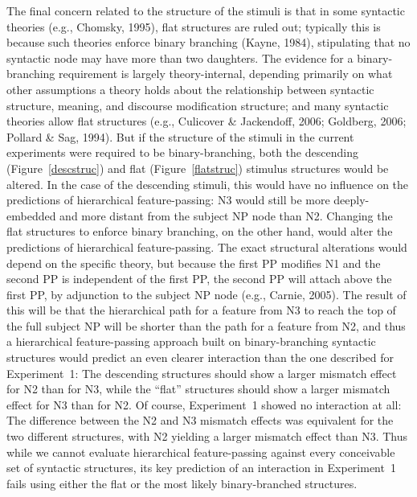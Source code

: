 \documentclass[12pt,titlepage]{article}
\newcommand{\TODO}[1]{\textbf{*** #1 ***}}  %
\newcommand{\IGNORE}[1]{} %
\begin{document}
The final concern related to the structure of the stimuli is that in some
syntactic theories (e.g., Chomsky, 1995\IGNORE{; \TODO{cite 1--2 other
theories/papers}}), flat structures are ruled out; typically this is
because such theories enforce binary branching (Kayne, 1984), stipulating
that no syntactic node may have more than two daughters.  The evidence for
a binary-branching requirement is largely theory-internal\IGNORE{ (though
cf.\ \TODO{Iris' suggested paper} and responses)}, depending primarily on
what other assumptions a theory holds about the relationship between
syntactic structure, meaning, and discourse modification structure; and
many syntactic theories allow flat structures (e.g., Culicover \&
Jackendoff, 2006; Goldberg, 2006; Pollard \& Sag, 1994).  But if the
structure of the stimuli in the current experiments were required to be
binary-branching, both the descending (Figure~\ref{descstruc}) and flat
(Figure~\ref{flatstruc}) stimulus structures would be altered.  In the case
of the descending stimuli, this would have no influence on the predictions
of hierarchical feature-passing: N3 would still be more deeply-embedded and
more distant from the subject NP node than N2.  Changing the flat
structures to enforce binary branching, on the other hand, would alter the
predictions of hierarchical feature-passing.  The exact structural
alterations would depend on the specific theory, but because the first PP
modifies N1 and the second PP is independent of the first PP, the second PP
will attach above the first PP, by adjunction to the subject NP node (e.g.,
Carnie, 2005\IGNORE{pg 121}).  The result of this will be that the
hierarchical path for a feature from N3 to reach the top of the full
subject NP will be shorter than the path for a feature from N2, and thus a
hierarchical feature-passing approach built on binary-branching syntactic
structures would predict an even clearer interaction than the one described
for Experiment~1: The descending structures should show a larger mismatch
effect for N2 than for N3, while the ``flat'' structures should show a
larger mismatch effect for N3 than for N2.  Of course, Experiment~1 showed
no interaction at all: The difference between the N2 and N3 mismatch
effects was equivalent for the two different structures, with N2 yielding a
larger mismatch effect than N3.  Thus while we cannot evaluate hierarchical
feature-passing against every conceivable set of syntactic structures, its
key prediction of an interaction in Experiment~1 fails using either the
flat or the most likely binary-branched structures.
\end{document}
